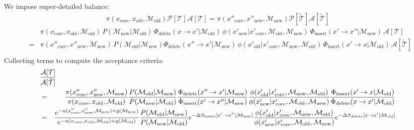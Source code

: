 \documentclass[aps,pre,twocolumn,nofootinbib,superscriptaddress,linenumbers,11point]{revtex4-1}
\begin{document}
\begin{widetext}
We impose super-detailed balance:
\begin{eqnarray}
\pi(x_\mathrm{core}, x_\mathrm{old}, \mathcal{M}_\mathrm{old}) \mathcal{P}[\mathcal{T}] \mathcal{A}[\mathcal{T}] = \pi(x''_\mathrm{core}, x''_\mathrm{new}, \mathcal{M}_\mathrm{new}) \mathcal{P}[\tilde{\mathcal{T}}] \mathcal{A}[\tilde{\mathcal{T}}]
\end{eqnarray}
\begin{eqnarray}
&& \pi(x_\mathrm{core}, x_\mathrm{old}, \mathcal{M}_\mathrm{old}) \, P(\mathcal{M}_\mathrm{new} | \mathcal{M}_\mathrm{old}) \, \Phi_\mathrm{delete}(x \rightarrow x' | \mathcal{M}_\mathrm{old}) \, \phi(x'_\mathrm{new} | x'_\mathrm{core}, \mathcal{M}_\mathrm{old}, \mathcal{M}_\mathrm{new}) \, \Phi_\mathrm{insert}(x' \rightarrow x'' | \mathcal{M}_\mathrm{new}) \, \mathcal{A}[\mathcal{T}] \nonumber \\
&=& \pi(x''_\mathrm{core}, x''_\mathrm{new}, \mathcal{M}_\mathrm{new}) \, P(\mathcal{M}_\mathrm{old} | \mathcal{M}_\mathrm{new}) \Phi_\mathrm{delete}(x'' \rightarrow x' | \mathcal{M}_\mathrm{new}) \, \phi(x'_\mathrm{old} | x'_\mathrm{core}, \mathcal{M}_\mathrm{new}, \mathcal{M}_\mathrm{old}) \, \Phi_\mathrm{insert}(x' \rightarrow x | \mathcal{M}_\mathrm{old}) \, \mathcal{A}[\tilde{\mathcal{T}}] \nonumber \\
\end{eqnarray}
Collecting terms to compute the acceptance criteria:
\begin{eqnarray}
\lefteqn{\frac{\mathcal{A}[\mathcal{T}]}{\mathcal{A}[\tilde{\mathcal{T}}]}} \nonumber \\
&=& \frac{\pi(x''_\mathrm{core}, x''_\mathrm{new}, \mathcal{M}_\mathrm{new})}{\pi(x_\mathrm{core}, x_\mathrm{old}, \mathcal{M}_\mathrm{old})} \frac{P(\mathcal{M}_\mathrm{old} | \mathcal{M}_\mathrm{new})}{P(\mathcal{M}_\mathrm{new} | \mathcal{M}_\mathrm{old})} \frac{\Phi_\mathrm{delete}(x'' \rightarrow x' | \mathcal{M}_\mathrm{new})}{\Phi_\mathrm{insert}(x' \rightarrow x'' | \mathcal{M}_\mathrm{new})} \frac{\phi(x'_\mathrm{old} | x'_\mathrm{core}, \mathcal{M}_\mathrm{new}, \mathcal{M}_\mathrm{old})}{\phi(x'_\mathrm{new} | x'_\mathrm{core}, \mathcal{M}_\mathrm{old}, \mathcal{M}_\mathrm{new})} \frac{\Phi_\mathrm{insert}(x' \rightarrow x | \mathcal{M}_\mathrm{old})}{\Phi_\mathrm{delete}(x \rightarrow x' | \mathcal{M}_\mathrm{old})} \\
&=& \frac{e^{-u(x''_\mathrm{core}, x''_\mathrm{new}, \mathcal{M}_\mathrm{new}) + g(\mathcal{M}_\mathrm{new})}}{e^{-u(x_\mathrm{core}, x_\mathrm{old}, \mathcal{M}_\mathrm{old}) + g(\mathcal{M}_\mathrm{old})}} \frac{P(\mathcal{M}_\mathrm{old} | \mathcal{M}_\mathrm{new})}{P(\mathcal{M}_\mathrm{new} | \mathcal{M}_\mathrm{old})} e^{-\Delta S_\mathrm{insert}[x' \rightarrow x'' | \mathcal{M}_\mathrm{new}]} \frac{\phi(x'_\mathrm{old} | x'_\mathrm{core}, \mathcal{M}_\mathrm{new}, \mathcal{M}_\mathrm{old})}{\phi(x'_\mathrm{new} | x'_\mathrm{core}, \mathcal{M}_\mathrm{old}, \mathcal{M}_\mathrm{new})} e^{-\Delta S_\mathrm{delete}[x \rightarrow x' | \mathcal{M}_\mathrm{old}]} \\

\end{eqnarray}
\end{widetext}
\end{document}
